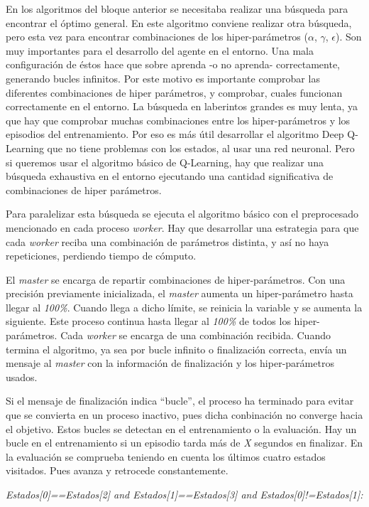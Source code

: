		
			
		En los algoritmos del bloque anterior se necesitaba realizar una búsqueda para encontrar el óptimo general. En este algoritmo conviene realizar otra búsqueda, pero esta vez para encontrar combinaciones de los hiper-parámetros ($\alpha$, $\gamma$, $\epsilon$). Son muy importantes para el desarrollo del agente en el entorno. Una mala configuración de éstos hace que sobre aprenda -o no aprenda- correctamente, generando bucles infinitos. Por este motivo es importante comprobar las diferentes combinaciones de hiper parámetros, y comprobar, cuales funcionan correctamente en el entorno. La búsqueda en laberintos grandes es muy lenta, ya que hay que comprobar muchas combinaciones entre los hiper-parámetros y los episodios del entrenamiento. Por eso es más útil desarrollar el algoritmo Deep Q-Learning que no tiene problemas con los estados, al usar una red neuronal. Pero si queremos usar el algoritmo básico de Q-Learning, hay que realizar una búsqueda exhaustiva en el entorno ejecutando una cantidad significativa de combinaciones de hiper parámetros.

		Para paralelizar esta búsqueda se ejecuta el algoritmo básico con el preprocesado mencionado en cada proceso \textit{worker}. Hay que desarrollar una estrategia para que cada \textit{worker} reciba una combinación de parámetros distinta, y así no haya repeticiones, perdiendo tiempo de cómputo. 
			
		El \textit{master} se encarga de repartir combinaciones de hiper-parámetros. Con una precisión previamente inicializada, el \textit{master} aumenta un hiper-parámetro hasta llegar al \textit{100\%}. Cuando llega a dicho límite, se reinicia la variable y se aumenta la siguiente. Este proceso continua hasta llegar al \textit{100\%} de todos los hiper-parámetros. Cada \textit{worker} se encarga de una combinación recibida. Cuando termina el algoritmo, ya sea por bucle infinito o finalización correcta, envía un mensaje al \textit{master} con la información de finalización y los hiper-parámetros usados.
		
		Si el mensaje de finalización indica ``bucle'', el proceso ha terminado para evitar que se convierta en un proceso inactivo, pues dicha conbinación no converge hacia el objetivo. Estos bucles se detectan en el entrenamiento o la evaluación. Hay un bucle en el entrenamiento si un episodio tarda más de \textit{X} segundos en finalizar. En la evaluación se comprueba teniendo en cuenta los últimos cuatro estados visitados. Pues avanza y retrocede constantemente. 
		\begin{center}
			\textit{Estados[0]==Estados[2] and Estados[1]==Estados[3] and Estados[0]!=Estados[1]: }
		\end{center}
		
